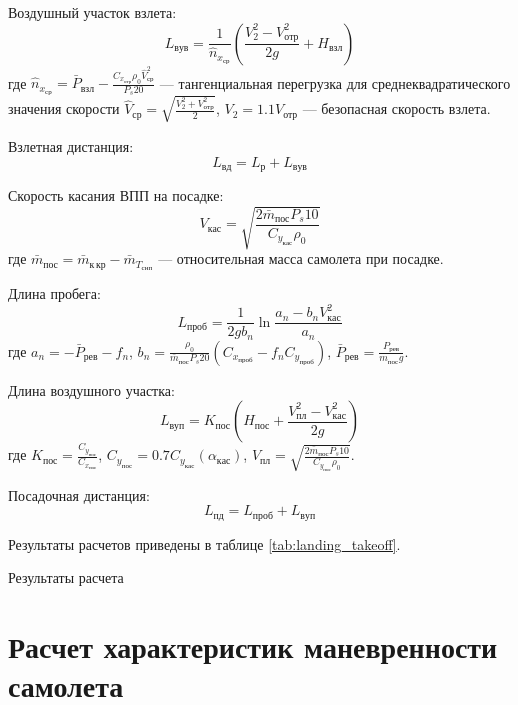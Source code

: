 Воздушный участок взлета:
\begin{equation}
    L_{вув} = \frac{1}{\hat{n}_{x_{ср}}} \left( \frac{V_2^2 - V_{отр}^2}{2g} +
    H_{взл}\right) 
\end{equation}
где  $\hat{n}_{x_{ср}} = \bar{P}_{взл} - \frac{C_{x_{отр}} \rho_0 \hat{V}_{ср}^2}
{P_s 20}$ --- тангенциальная перегрузка для среднеквадратического значения скорости
$\hat{V}_{ср} = \sqrt{\frac{V_2^2 + V_{отр}^2}{2}}$, $V_2 = 1.1 V_{отр}$ --- безопасная скорость взлета. 

Взлетная дистанция:
\begin{equation}
    L_{вд} = L_{р} + L_{вув}
\end{equation}

Скорость касания ВПП на посадке:
\begin{equation}
    V_{кас} = \sqrt{\frac{2 \bar{m}_{пос} P_s 10 }{ C_{y_{кас}} \rho_0 }}
\end{equation}
где $\bar{m}_{пос} = \bar{m}_{к\, кр} - \bar{m}_{T_{снп}}$ --- относительная
масса самолета при посадке.

Длина пробега:
\begin{equation}
    L_{проб} = \frac{1}{2g b_n} \ln{\frac{a_n - b_n V_{кас}^2}{a_n}}
\end{equation}
где $a_n = - \bar{P}_{рев} - f_n$, $b_n = \frac{\rho_0}{\bar{m}_{пос} P_s 20}
(C_{x_{проб}} - f_n C_{y_{проб}})$, $\bar{P}_{рев} = \frac{P_{рев}}{m_{пос} g}$.

Длина воздушного участка:
\begin{equation}
    L_{вуп} = K_{пос} \left( H_{пос} + \frac{V_{пл}^2 - V_{кас}^2}{2g} \right) 
\end{equation}
где $K_{пос} = \frac{C_{y_{пос}}}{C_{x_{пос}}}$, $C_{y_{пос}} = 0.7
C_{y_{кас}}(\alpha_{кас})$, $V_{пл} = \sqrt{\frac{2 \bar{m}_{пос} P_s 10
}{C_{y_{пос}} \rho_0}}$.

Посадочная дистанция:
\begin{equation}
    L_{пд} = L_{проб} + L_{вуп}
\end{equation}

Результаты расчетов приведены в таблице \ref{tab:landing_takeoff}. 

\begin{table}[H]
    \centering
    \caption{Результаты расчета}
    \label{tab:landing_takeoff}
    
\end{table}

\section{Расчет характеристик маневренности самолета}

